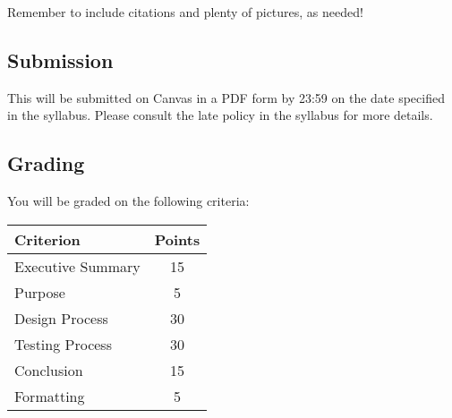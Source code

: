 Remember to include citations and plenty of pictures, as needed!
    
    \subsection*{Submission}
    This will be submitted on Canvas in a PDF form by 23:59 on the date specified in the syllabus.
    Please consult the late policy in the syllabus for more details.

    \subsection*{Grading}
    You will be graded on the following criteria:

    \begin{table}[h!]
        \begin{tabular}{l | c}
            \toprule
            Criterion & Points \\
            \midrule
            Executive Summary & 15 \\
            Purpose & 5 \\
            Design Process & 30 \\
            Testing Process & 30 \\
            Conclusion & 15 \\
            Formatting & 5 \\
            \bottomrule
        \end{tabular}
    \end{table}
        

